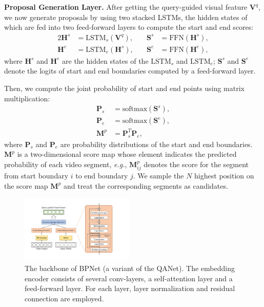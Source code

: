 \documentclass[letterpaper]{article} %
\newcommand{\eg}{\emph{e.g.}}
\begin{document}
\noindent\textbf{Proposal Generation Layer.}
After getting the query-guided visual feature $\bm{V}^{q}$,
we now generate proposals by using two stacked LSTMs, the hidden states of which are fed into two feed-forward layers to compute the start and end scores:
\begin{alignat}{2}
\bm{H}^{s}&= \text{LSTM}_{s}(\bm{V}^{q}), \quad &\bm{S}^{s}&= \text{FFN}(\bm{H}^{s}), \\
\bm{H}^{e}&= \text{LSTM}_{e}(\bm{H}^{s}), \quad &\bm{S}^{e}&= \text{FFN}(\bm{H}^{e}),
\label{equation45}
\end{alignat}
where $\bm{H}^{s}$ and $\bm{H}^{e}$ are the hidden states of the
$\text{LSTM}_{s}$ and $\text{LSTM}_{e}$; $\bm{S}^{s}$ and $\bm{S}^{e}$ denote the logits of start and end boundaries computed by a feed-forward layer.

Then, we compute the joint probability of start and end points using
matrix multiplication:
\begin{equation}
\begin{split}
\bm{P}_{s}&=\text{softmax}(\bm{S}^{s}), \\
\bm{P}_{e}&=\text{softmax}(\bm{S}^{e}), \\
\bm{M}^{p} &= \bm{P}_{s}^{T}\bm{P}_{e},
\end{split}
\label{equation6}
\end{equation}
where $\bm{P}_{s}$ and $\bm{P}_{e}$ are probability distributions of the start and end boundaries.
$\bm{M}^{p}$ is a two-dimensional score map whose element indicates the predicted probability
of each video segment, \eg, $\bm{M}^{p}_{ij}$ denotes the score for the segment from start boundary $i$ to
end boundary $j$.
We sample the $N$ highest position on the score map $\bm{M}^{p}$ and treat the corresponding segments as
candidates.

\begin{figure}[t]
    \centering
    \includegraphics[width=0.48\textwidth]{figure3_1_cut.pdf} %
    \caption{The backbone of BPNet (a variant of the QANet).
    The embedding encoder consists of several conv-layers, a self-attention layer and a feed-forward layer. For each layer, layer normalization and residual connection are employed.
    }
    \label{figure3}
\end{figure}
\end{document}
